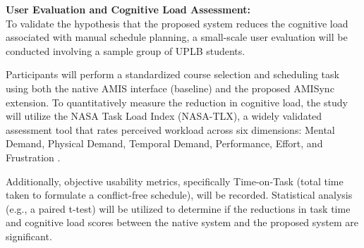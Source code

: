 \documentclass{icsthesis}
\begin{document}
\begin{mainmatter}
		\vspace{2ex}
		\textbf{User Evaluation and Cognitive Load Assessment:} \\
		To validate the hypothesis that the proposed system reduces the cognitive load associated with manual schedule planning, a small-scale user evaluation will be conducted involving a sample group of UPLB students. 

		Participants will perform a standardized course selection and scheduling task using both the native AMIS interface (baseline) and the proposed AMISync extension. To quantitatively measure the reduction in cognitive load, the study will utilize the NASA Task Load Index (NASA-TLX), a widely validated assessment tool that rates perceived workload across six dimensions: Mental Demand, Physical Demand, Temporal Demand, Performance, Effort, and Frustration \citep{hart1988}. 

		Additionally, objective usability metrics, specifically Time-on-Task (total time taken to formulate a conflict-free schedule), will be recorded. Statistical analysis (e.g., a paired t-test) will be utilized to determine if the reductions in task time and cognitive load scores between the native system and the proposed system are significant.
		
			
	\end{mainmatter}
\end{document}

